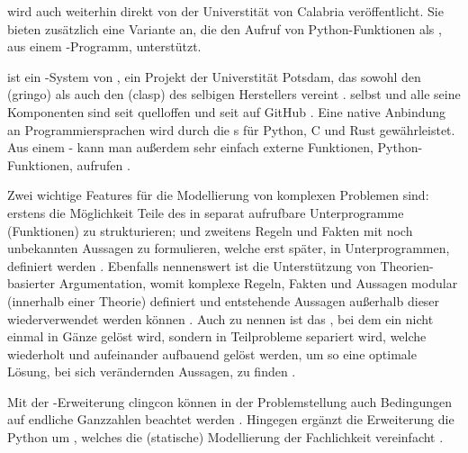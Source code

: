 \begin{description}
     wird auch weiterhin direkt von der Universtität von Calabria veröffentlicht.
    Sie bieten zusätzlich eine Variante an, die den Aufruf von Python-Funktionen als , aus einem -Programm, unterstützt.

    \item[Clingo] ist ein -System von , ein Projekt der Universtität Potsdam, das sowohl den \sog {} (gringo) als auch den  (clasp) des selbigen Herstellers  vereint .
     selbst und alle seine Komponenten sind seit  quelloffen und seit  auf GitHub .
    Eine native Anbindung an Programmiersprachen wird durch die s für Python, C und Rust gewährleistet.
    Aus einem - kann man außerdem sehr einfach externe Funktionen, \zB Python-Funktionen, aufrufen .

    Zwei wichtige Features für die Modellierung von komplexen Problemen sind:
    erstens die Möglichkeit Teile des  in separat aufrufbare Unterprogramme (Funktionen) zu strukturieren;
    und zweitens Regeln und Fakten mit noch unbekannten Aussagen zu formulieren, welche erst später, \zB in Unterprogrammen, definiert werden .
    Ebenfalls nennenswert ist die Unterstützung von Theorien-basierter Argumentation, womit komplexe Regeln, Fakten und Aussagen modular (innerhalb einer Theorie) definiert und entstehende Aussagen außerhalb dieser wiederverwendet werden können .
    Auch zu nennen ist das , bei dem ein  nicht einmal in Gänze gelöst wird, sondern in Teilprobleme separiert wird, welche wiederholt und aufeinander aufbauend gelöst werden, um so eine optimale Lösung, bei sich verändernden Aussagen, zu finden .

    Mit der -Erweiterung clingcon können in der Problemstellung auch Bedingungen auf endliche Ganzzahlen beachtet werden .
    Hingegen ergänzt die Erweiterung  die Python  um , welches die (statische) Modellierung der Fachlichkeit vereinfacht .
\end{description}



